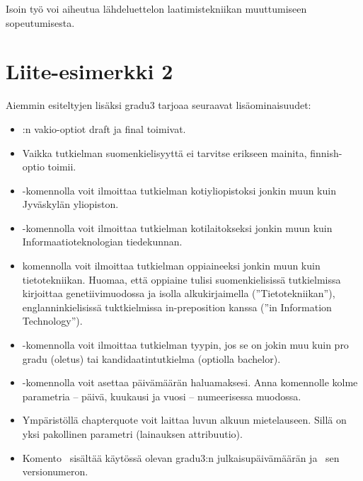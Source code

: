 \documentclass[utf8]{gradu3}
\begin{document}
Isoin työ voi aiheutua lähdeluettelon laatimistekniikan muuttumiseen
sopeutumisesta.

\section{Liite-esimerkki 2}

Aiemmin esiteltyjen lisäksi gradu3 tarjoaa seuraavat lisäominaisuudet:
\begin{itemize}
\item \LaTeXe:n vakio-optiot draft ja final toimivat.
\item Vaikka tutkielman suomenkielisyyttä ei tarvitse erikseen
  mainita, finnish-optio toimii.
\item \string\university-komennolla voit ilmoittaa tutkielman
  kotiyliopistoksi jonkin muun kuin Jyväskylän yliopiston.
\item  \string\department-komennolla voit ilmoittaa tutkielman
  kotilaitokseksi jonkin muun kuin Informaatioteknologian tiedekunnan.
\item \string\subject-komennolla voit ilmoittaa tutkielman
  oppiaineeksi jonkin muun kuin tietotekniikan.  Huomaa, että oppiaine
  tulisi suomenkielisissä tutkielmissa kirjoittaa genetiivimuodossa ja
  isolla alkukirjaimella (''Tietotekniikan''), englanninkielisissä
  tuktkielmissa in-preposition kanssa (''in Information Technology'').
\item \string\type-komennolla voit ilmoittaa tutkielman tyypin, jos se
  on jokin muu kuin pro gradu (oletus) tai kandidaatintutkielma
  (optiolla bachelor).
\item \string\setdate-komennolla voit asettaa päivämäärän
  haluamaksesi.  Anna komennolle kolme parametria -- päivä,
  kuukausi ja vuosi -- numeerisessa muodossa.
\item Ympäristöllä chapterquote voit laittaa luvun alkuun
  mietelauseen.  Sillä on yksi pakollinen parametri (lainauksen
  attribuutio).
\item Komento \string\graduclsdate\ sisältää käytössä olevan gradu3:n
  julkaisupäivämäärän ja \string\graduclsversion\ sen versionumeron.
\end{itemize}
\end{document}
